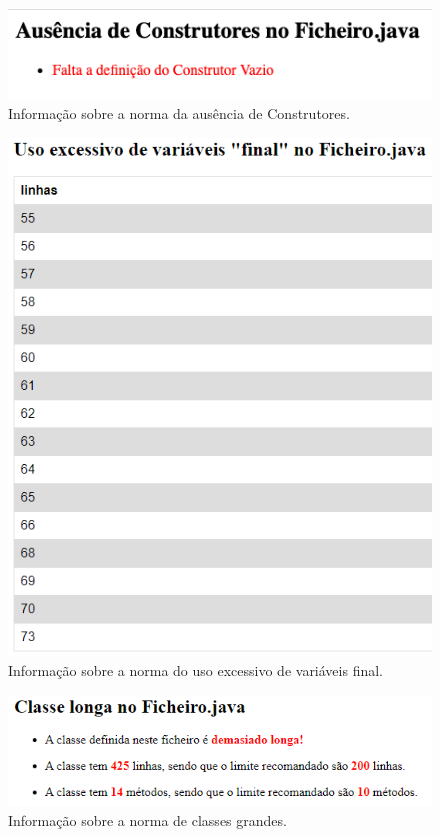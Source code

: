 \begin{figure}[H]
    \centering
    \includegraphics[scale=0.5]{images/n5.png}
    \caption{Informação sobre a norma da ausência de Construtores.}
    \label{img:n1}
\end{figure}

\begin{figure}[H]
    \centering
    \includegraphics[scale=0.75]{images/manyFinals.PNG}
    \caption{Informação sobre a norma do uso excessivo de variáveis final.}
    \label{img:n1}
\end{figure}

\begin{figure}[H]
    \centering
    \includegraphics[scale=0.75]{images/large-class.PNG}
    \caption{Informação sobre a norma de classes grandes.}
    \label{img:n1}
\end{figure}
